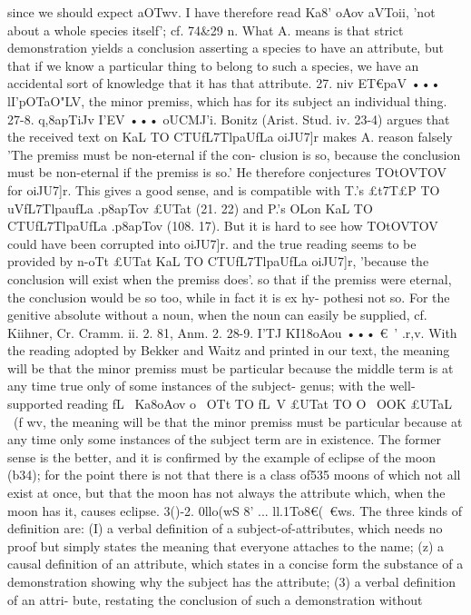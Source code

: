 {{{{{{{{{since we should expect aOTwv. I have therefore read Ka8' oAov
aVToii, 'not about a whole species itself'; cf. 74&29 n. What A.
means is that strict demonstration yields a conclusion asserting
a species to have an attribute, but that if we know a particular
thing to belong to such a species, we have an accidental sort of
knowledge that it has that attribute.
27. niv ET€paV ••• lI'pOTaO"LV, the minor premiss, which has for
its subject an individual thing.
27-8. q,8apTiJv I'EV ••• oUCMJ'i. Bonitz (Arist. Stud. iv. 23-4)
argues that the received text on KaL TO CTUfL7TlpaUfLa oiJU7]r makes
A. reason falsely 'The premiss must be non-eternal if the con-
clusion is so, because the conclusion must be non-eternal if the
premiss is so.' He therefore conjectures TOtOVTOV for oiJU7]r. This
gives a good sense, and is compatible with T.'s £t7T£P TO uVfL7TlpaufLa
.p8apTov £UTat (21. 22) and P.'s OLon KaL TO CTUfL7TlpaUfLa .p8apTov
(108. 17). But it is hard to see how TOtOVTOV could have been
corrupted into oiJU7]r. and the true reading seems to be provided
by n-oTt £UTat KaL TO CTUfL7TlpaUfLa oiJU7]r, 'because the conclusion
will exist when the premiss does'. so that if the premiss were
eternal, the conclusion would be so too, while in fact it is ex hy-
pothesi not so. For the genitive absolute without a noun, when
the noun can easily be supplied, cf. Kiihner, Cr. Cramm. ii. 2.
81, Anm. 2.
28-9. I'TJ KI18oAou ••• €~' .r,v. With the reading adopted by
Bekker and Waitz and printed in our text, the meaning will be
that the minor premiss must be particular because the middle
term is at any time true only of some instances of the subject-
genus; with the well-supported reading fL~ Ka8oAov o~ OTt TO fL~V
£UTat TO O~ OOK £UTaL ~(f wv, the meaning will be that the minor
premiss must be particular because at any time only some
instances of the subject term are in existence. The former sense
is the better, and it is confirmed by the example of eclipse of the
moon (b34); for the point there is not that there is a class of535
moons of which not all exist at once, but that the moon has not
always the attribute which, when the moon has it, causes eclipse.
3()-2. 0llo(wS 8' ... ll.1To8€(~€ws. The three kinds of definition
are: (I) a verbal definition of a subject-of-attributes, which needs
no proof but simply states the meaning that everyone attaches
to the name; (z) a causal definition of an attribute, which states
in a concise form the substance of a demonstration showing why
the subject has the attribute; (3) a verbal definition of an attri-
bute, restating the conclusion of such a demonstration without
}}}}}}}}}
